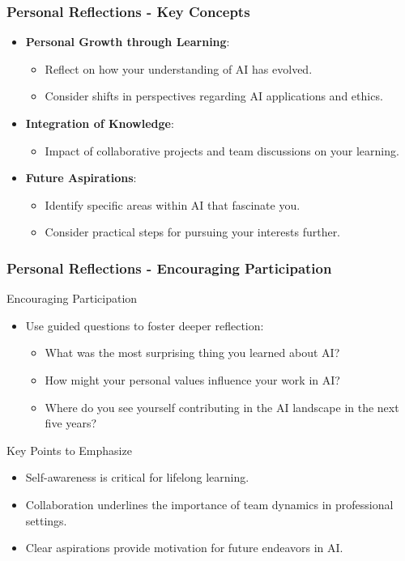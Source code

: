 \documentclass[aspectratio=169]{beamer}
\begin{document}
\begin{frame}[fragile]
    \frametitle{Personal Reflections - Key Concepts}
    \begin{itemize}
        \item \textbf{Personal Growth through Learning}:
            \begin{itemize}
                \item Reflect on how your understanding of AI has evolved.
                \item Consider shifts in perspectives regarding AI applications and ethics.
            \end{itemize}
        \item \textbf{Integration of Knowledge}:
            \begin{itemize}
                \item Impact of collaborative projects and team discussions on your learning.
            \end{itemize}
        \item \textbf{Future Aspirations}:
            \begin{itemize}
                \item Identify specific areas within AI that fascinate you.
                \item Consider practical steps for pursuing your interests further.
            \end{itemize}
    \end{itemize}
\end{frame}

\begin{frame}[fragile]
    \frametitle{Personal Reflections - Encouraging Participation}
    \begin{block}{Encouraging Participation}
        \begin{itemize}
            \item Use guided questions to foster deeper reflection:
                \begin{itemize}
                    \item What was the most surprising thing you learned about AI?
                    \item How might your personal values influence your work in AI?
                    \item Where do you see yourself contributing in the AI landscape in the next five years?
                \end{itemize}
        \end{itemize}
    \end{block}
    \begin{block}{Key Points to Emphasize}
        \begin{itemize}
            \item Self-awareness is critical for lifelong learning.
            \item Collaboration underlines the importance of team dynamics in professional settings.
            \item Clear aspirations provide motivation for future endeavors in AI.
        \end{itemize}
    \end{block}
\end{frame}
\end{document}
